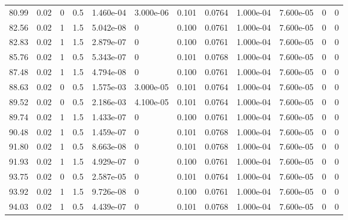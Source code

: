 \documentclass[preview]{standalone}
\begin{document}
{{{\begin{tabular}{L{1.2cm}C{1.2cm} C{0.3cm}C{0.5cm} C{1.4cm}C{1.4cm} C{1.4cm}C{1.4cm} C{1.6cm}C{1.6cm} C{1.6cm}C{1.6cm}}
  80.99  &  0.02  & 0     & 0.5 &  1.460e-04  & 3.000e-06  &  0.101&   0.0764& 1.000e-04 & 7.600e-05   &  0 & 0  \\ 
  82.56  &  0.02  & 1     & 1.5 &  5.042e-08  & 0  &  0.100&   0.0761& 1.000e-04 & 7.600e-05   &  0 & 0  \\ 
  82.83  &  0.02  & 1     & 1.5 &  2.879e-07  & 0  &  0.100&   0.0761& 1.000e-04 & 7.600e-05   &  0 & 0  \\ 
  85.76  &  0.02  & 1     & 0.5 &  5.343e-07  & 0  &  0.101&   0.0768& 1.000e-04 & 7.600e-05   &  0 & 0  \\ 
  87.48  &  0.02  & 1     & 1.5 &  4.794e-08  & 0  &  0.100&   0.0761& 1.000e-04 & 7.600e-05   &  0 & 0  \\ 
  88.63  &  0.02  & 0     & 0.5 &  1.575e-03  & 3.000e-05  &  0.101&   0.0764& 1.000e-04 & 7.600e-05   &  0 & 0  \\ 
  89.52  &  0.02  & 0     & 0.5 &  2.186e-03  & 4.100e-05  &  0.101&   0.0764& 1.000e-04 & 7.600e-05   &  0 & 0  \\ 
  89.74  &  0.02  & 1     & 1.5 &  1.433e-07  & 0  &  0.100&   0.0761& 1.000e-04 & 7.600e-05   &  0 & 0  \\ 
  90.48  &  0.02  & 1     & 0.5 &  1.459e-07  & 0  &  0.101&   0.0768& 1.000e-04 & 7.600e-05   &  0 & 0  \\ 
  91.80  &  0.02  & 1     & 0.5 &  8.663e-08  & 0  &  0.101&   0.0768& 1.000e-04 & 7.600e-05   &  0 & 0  \\ 
  91.93  &  0.02  & 1     & 1.5 &  4.929e-07  & 0  &  0.100&   0.0761& 1.000e-04 & 7.600e-05   &  0 & 0  \\ 
  93.75  &  0.02  & 0     & 0.5 &  2.587e-05  & 0  &  0.101&   0.0764& 1.000e-04 & 7.600e-05   &  0 & 0  \\ 
  93.92  &  0.02  & 1     & 1.5 &  9.726e-08  & 0  &  0.100&   0.0761& 1.000e-04 & 7.600e-05   &  0 & 0  \\ 
  94.03  &  0.02  & 1     & 0.5 &  4.439e-07  & 0  &  0.101&   0.0768& 1.000e-04 & 7.600e-05   &  0 & 0  \\ 
\hline 
\end{tabular} 

}}}
\end{document}
